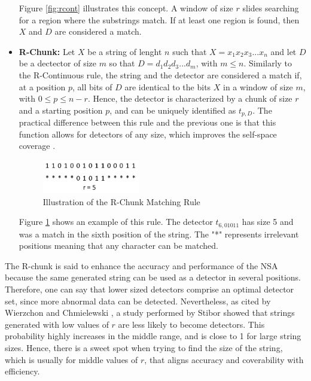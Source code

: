 \begin{itemize}
	Figure \ref{fig:rcont} illustrates this concept. A window of size \(r\) slides searching for a region where the substrings match. If at least one region is found, then \(X\) and \(D\) are considered a match.
    
    \item \textbf{R-Chunk:} Let \(X\) be a string of lenght \(n\) such that \(X = x_1 x_2 x_3...x_n\) and let \(D\) be a dectector of size \(m\) so that \(D = d_1 d_2 d_3...d_m\), with \( m \leq n\). Similarly to the R-Continuous rule, the string and the detector are considered a match if, at a position \(p\), all bits of \(D\) are identical to the bits \(X\) in a window of size \(m\), with \(0 \leq p \leq n - r\).  Hence, the detector is characterized by a chunk of size \(r\) and a starting position \(p\), and can be uniquely identified as \(t_{p, D}\). The practical difference between this rule and the previous one is that this function allows for detectors of any size, which improves the self-space coverage \cite{ICBook2009}.
    
	\begin{figure}[!h]
		\centering
		\includegraphics[width=0.4\textwidth, keepaspectratio]{img/rchunk.png}
		\caption{Illustration of the R-Chunk Matching Rule}
		\label{fig:rchunk}
	\end{figure}

	Figure \ref{fig:rchunk} shows an example of this rule. The detector \(t_{6, 01011}\) has size 5 and was a match in the sixth position of the string. The "*" represents irrelevant positions meaning that any character can be matched. 
\end{itemize}

The R-chunk is said to enhance the accuracy and performance of the NSA \cite{EffectBinaryRule2003} because the same generated string can be used as a detector in several positions. Therefore, one can say that lower sized detectors comprise an optimal detector set, since more abnormal data can be detected. Nevertheless, as cited by Wierzchon and Chmielewski \cite{HybridNSA2012}, a study performed by Stibor showed that strings generated with low values of \(r\) are less likely to become detectors. This probability highly increases in the middle range, and is close to 1 for large string sizes. Hence, there is a sweet spot when trying to find the size of the string, which is usually for middle values of \(r\), that aligns accuracy and coverability with efficiency.

